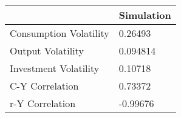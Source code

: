 \begin{tabular}{ll}
& Simulation \\ 
\hline 
Consumption Volatility & 0.26493 \\ 
Output Volatility & 0.094814 \\ 
Investment Volatility & 0.10718 \\ 
C-Y Correlation & 0.73372 \\ 
r-Y Correlation & -0.99676 \\ 
\hline 
\end{tabular}